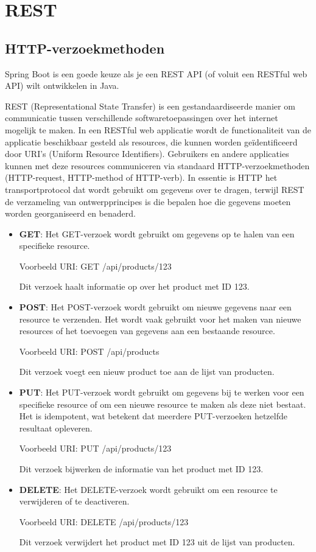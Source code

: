 \chapter{REST}

\section{HTTP-verzoekmethoden}

Spring Boot is een goede keuze als je een REST API (of voluit een RESTful web API) wilt ontwikkelen in Java.

REST (Representational State Transfer) is een gestandaardiseerde manier om communicatie tussen verschillende softwaretoepassingen over het internet mogelijk te maken. 
In een RESTful web applicatie wordt de functionaliteit van de applicatie beschikbaar gesteld als resources, die kunnen worden geïdentificeerd door URI's (Uniform Resource Identifiers).  Gebruikers en andere applicaties kunnen met deze resources communiceren via standaard HTTP-verzoekmethoden (HTTP-request, HTTP-method of HTTP-verb). In essentie is HTTP het transportprotocol dat wordt gebruikt om gegevens over te dragen,  terwijl REST de verzameling van ontwerpprincipes is die bepalen hoe die gegevens moeten worden georganiseerd en benaderd.

\begin{itemize}
\item \textbf{GET}: Het GET-verzoek wordt gebruikt om gegevens op te halen van een specifieke resource. 

Voorbeeld URI: GET /api/products/123

Dit verzoek haalt informatie op over het product met ID 123.

\item \textbf{POST}: Het POST-verzoek wordt gebruikt om nieuwe gegevens naar een resource te verzenden. Het wordt vaak gebruikt voor het maken van nieuwe resources of het toevoegen van gegevens aan een bestaande resource.

Voorbeeld URI: POST /api/products

Dit verzoek voegt een nieuw product toe aan de lijst van producten.

\item \textbf{PUT}: Het PUT-verzoek wordt gebruikt om gegevens bij te werken voor een specifieke resource of om een nieuwe resource te maken als deze niet bestaat. Het is idempotent, wat betekent dat meerdere PUT-verzoeken hetzelfde resultaat opleveren.

Voorbeeld URI: PUT /api/products/123

Dit verzoek bijwerken de informatie van het product met ID 123.

\item \textbf{DELETE}: Het DELETE-verzoek wordt gebruikt om een resource te verwijderen of te deactiveren.

Voorbeeld URI: DELETE /api/products/123

Dit verzoek verwijdert het product met ID 123 uit de lijst van producten.
\end{itemize}

